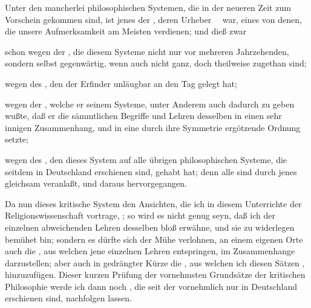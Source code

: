 Unter den mancherlei philosophischen Systemen, die in der neueren Zeit zum Vorschein gekommen sind, ist jenes der , deren Urheber ~\ war, eines von denen, die unsere Aufmerksamkeit am Meisten verdienen; und dieß zwar
\begin{aufzb}
\item schon wegen der , die diesem Systeme nicht nur vor mehreren Jahrzehenden, sondern selbst gegenwärtig, wenn auch nicht ganz, doch theilweise zugethan sind;
\item wegen des , den der Erfinder unläugbar an den Tag gelegt hat;
\item wegen der , welche er seinem Systeme, unter Anderem auch dadurch zu geben wußte, daß er die sämmtlichen Begriffe und Lehren desselben in einen sehr innigen Zusammenhang, und in eine durch ihre Symmetrie ergötzende Ordnung setzte;
\item wegen des , den dieses System auf alle übrigen philosophischen Systeme, die seitdem in Deutschland erschienen sind, gehabt hat; denn alle sind durch jenes gleichsam veranlaßt, und daraus hervorgegangen.
\end{aufzb}\par
Da nun dieses kritische System den Ansichten, die ich in diesem Unterrichte der Religionswissenschaft vortrage, ; so wird es nicht genug seyn, daß ich der einzelnen abweichenden Lehren desselben bloß  erwähne, und sie zu widerlegen bemühet bin; sondern es dürfte sich der Mühe verlohnen, an einem eigenen Orte auch die , aus welchen jene einzelnen Lehren entspringen, im Zusammenhange darzustellen; aber auch in gedrängter Kürze die , aus welchen ich diesen Sätzen , hinzuzufügen. Dieser kurzen Prüfung der vornehmsten Grundsätze der kritischen Philosophie werde ich dann noch , die seit der  vornehmlich nur in Deutschland erschienen sind, nachfolgen lassen.

